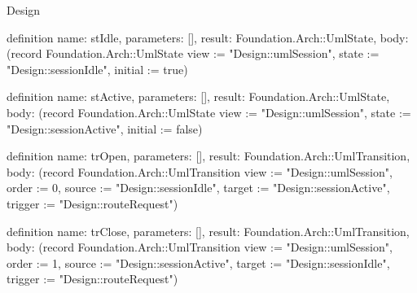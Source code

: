 \begin{lexlean}{Design}
\begin{semanticmodule}
definition{
  name: stIdle,
  parameters: [],
  result: Foundation.Arch::UmlState,
  body: (record Foundation.Arch::UmlState {view := "Design::umlSession", state := "Design::sessionIdle", initial := true})
}

definition{
  name: stActive,
  parameters: [],
  result: Foundation.Arch::UmlState,
  body: (record Foundation.Arch::UmlState {view := "Design::umlSession", state := "Design::sessionActive", initial := false})
}

definition{
  name: trOpen,
  parameters: [],
  result: Foundation.Arch::UmlTransition,
  body: (record Foundation.Arch::UmlTransition {view := "Design::umlSession", order := 0, source := "Design::sessionIdle", target := "Design::sessionActive", trigger := "Design::routeRequest"})
}

definition{
  name: trClose,
  parameters: [],
  result: Foundation.Arch::UmlTransition,
  body: (record Foundation.Arch::UmlTransition {view := "Design::umlSession", order := 1, source := "Design::sessionActive", target := "Design::sessionIdle", trigger := "Design::routeRequest"})
}

\end{semanticmodule}
\end{lexlean}
